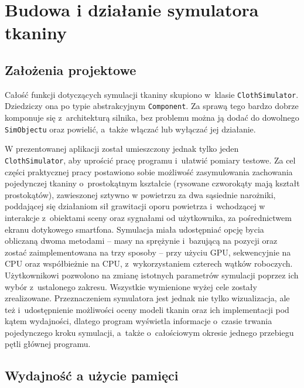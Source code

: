 \chapter{Budowa i działanie symulatora tkaniny}
\label{t:symulacja}

	\section{Założenia projektowe}
	\label{t:symulacja:zalozenia}
	
	
	Całość funkcji dotyczących symulacji tkaniny skupiono w~klasie \texttt{ClothSimulator}. Dziedziczy ona po typie abstrakcyjnym \texttt{Component}. Za sprawą tego bardzo dobrze komponuje się z~architekturą silnika, bez problemu można ją dodać do dowolnego \texttt{SimObjectu} oraz powielić, a~także włączać lub wyłączać jej działanie.
	
	W prezentowanej aplikacji został umieszczony jednak tylko jeden \texttt{ClothSimulator}, aby uprościć pracę programu i~ułatwić pomiary testowe. Za cel części praktycznej pracy postawiono sobie możliwość zasymulowania zachowania pojedynczej tkaniny o~prostokątnym kształcie (rysowane czworokąty mają kształt prostokątów), zawieszonej sztywno w powietrzu za dwa sąsiednie narożniki, poddającej się działaniom sił grawitacji oporu powietrza i~wchodzącej w interakcje z~obiektami sceny oraz sygnałami od użytkownika, za pośrednictwem ekranu dotykowego smartfona. Symulacja miała udostępniać opcję bycia obliczaną dwoma metodami -- masy na sprężynie i~bazującą na pozycji oraz zostać zaimplementowana na trzy sposoby -- przy użyciu GPU, sekwencyjnie na CPU oraz współbieżnie na CPU, z~wykorzystaniem czterech wątków roboczych. Użytkownikowi pozwolono na zmianę istotnych parametrów symulacji poprzez ich wybór z~ustalonego zakresu. Wszystkie wymienione wyżej cele zostały zrealizowane. Przeznaczeniem symulatora jest jednak nie tylko wizualizacja, ale też i~udostępnienie możliwości oceny modeli tkanin oraz ich implementacji pod kątem wydajności, dlatego program wyświetla informacje o~czasie trwania pojedynczego kroku symulacji, a~także o~całościowym okresie jednego przebiegu pętli głównej programu. 
	
	\section{Wydajność a użycie pamięci}
	\label{t:symulacja:wydajnoscpamiec}
	
